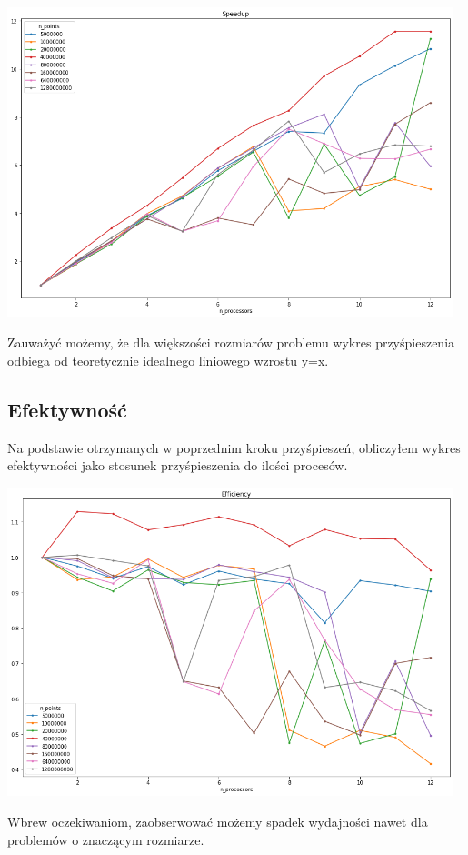 \documentclass{article}
\begin{document}
        \begin{center}
            \includegraphics[width=13cm]{report1/images/ex2_vcl_speedup.png}
        \end{center}
        
        Zauważyć możemy, że dla większości rozmiarów problemu wykres przyśpieszenia odbiega od teoretycznie idealnego liniowego wzrostu y=x. 
        
        \subsection{Efektywność}
        Na podstawie otrzymanych w poprzednim kroku przyśpieszeń, obliczyłem wykres efektywności jako stosunek przyśpieszenia do ilości procesów. 
        \begin{center}
            \includegraphics[width=13cm]{report1/images/ex2_efficiency.png}
        \end{center}
        Wbrew oczekiwaniom, zaobserwować możemy spadek wydajności nawet dla problemów o znaczącym rozmiarze. 
        
\end{document}
